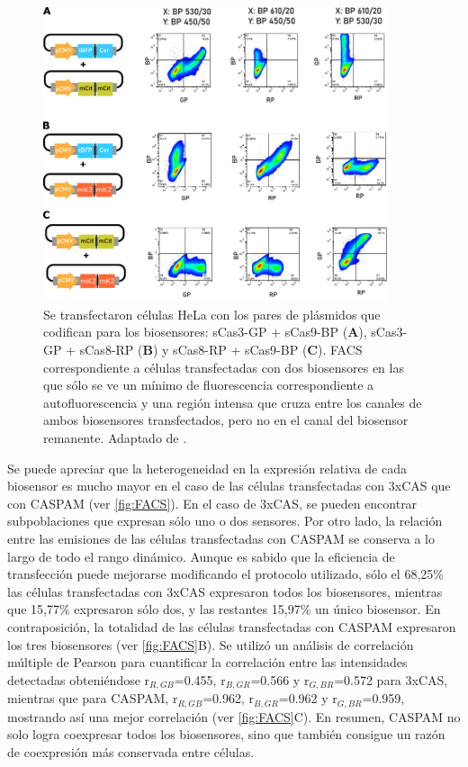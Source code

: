 \begin{figure}
    \centering
    \includegraphics[width=0.9\textwidth]{img/cap_3/FACS_dobles.pdf}
    \caption{\footnotesize{Se transfectaron células HeLa con los pares de plásmidos que codifican para los biosensores: sCas3-GP + sCas9-BP (\textbf{A}), sCas3-GP + sCas8-RP (\textbf{B}) y sCas8-RP + sCas9-BP (\textbf{C}). FACS correspondiente a células transfectadas con dos biosensores en las que sólo se ve un mínimo de fluorescencia correspondiente a autofluorescencia y una región intensa que cruza entre los canales de ambos biosensores transfectados, pero no en el canal del biosensor remanente. Adaptado de \cite{Habif2021}.}}
    \label{fig:FACS_dobles}
\end{figure}

Se puede apreciar que la heterogeneidad en la expresión relativa de cada biosensor es mucho mayor en el caso de las células transfectadas con 3xCAS que con CASPAM (ver \cref{fig:FACS}). En el caso de 3xCAS, se pueden encontrar subpoblaciones que expresan sólo uno o dos sensores. Por otro lado, la relación entre las emisiones de las células transfectadas con CASPAM se conserva a lo largo de todo el rango dinámico. Aunque es sabido que la eficiencia de transfección puede mejorarse modificando el protocolo utilizado, sólo el 68,25\% las células transfectadas con 3xCAS expresaron todos los biosensores, mientras que 15,77\% expresaron sólo dos, y las restantes 15,97\% un único biosensor. En contraposición, la totalidad de las células transfectadas con CASPAM expresaron los tres biosensores (ver \cref{fig:FACS}B). Se utilizó un análisis de correlación múltiple de Pearson para cuantificar la correlación entre las intensidades detectadas obteniéndose r$_{R,GB}$=0.455, r$_{B,GR}$=0.566 y r$_{G,BR}$=0.572 para 3xCAS, mientras que para CASPAM, r$_{R,GB}$=0.962, r$_{B,GR}$=0.962 y r$_{G,BR}$=0.959, mostrando así una mejor correlación (ver \cref{fig:FACS}C). En resumen, CASPAM no solo logra coexpresar todos los biosensores, sino que también consigue un razón de coexpresión más conservada entre células.

